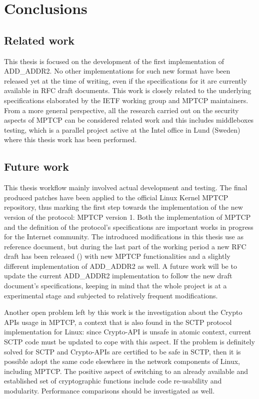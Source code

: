 \chapter{Conclusions}
\label{chap:conclusions}

\section{Related work}
This thesis is focused on the development of the first implementation of ADD\_ADDR2. No other implementations for such new format have been released yet at the time of writing, even if the specifications for it are currently available in RFC draft documents. This work is closely related to the underlying specifications elaborated by the IETF working group and MPTCP maintainers. From a more general perspective, all the research carried out on the security aspects of MPTCP can be considered related work and this includes middleboxes testing, which is a parallel project active at the Intel office in Lund (Sweden) where this thesis work has been performed. 

\section{Future work}
\label{future}
This thesis workflow mainly involved actual development and testing. The final produced patches have been applied to the official Linux Kernel MPTCP repository, thus marking the first step towards the implementation of the new version of the protocol: MPTCP version 1. 
Both the implementation of MPTCP and the definition of the protocol's specifications are important works in progress for the Internet community. The introduced modifications in this thesis use  as reference document, but during the last part of the working period a new RFC draft has been released () with new MPTCP functionalities and a slightly different implementation of ADD\_ADDR2 as well. A future work will be to update the current ADD\_ADDR2 implementation to follow the new draft document's specifications, keeping in mind that the whole project is at a experimental stage and subjected to relatively frequent modifications.

Another open problem left by this work is the investigation about the Crypto APIs usage in MPTCP, a context that is also found in the SCTP protocol implementation for Linux: since Crypto-API is unsafe in atomic context, current SCTP code must be updated to cope with this aspect. If the problem is definitely solved for SCTP and Crypto-APIs are certified to be safe in SCTP, then it is possible adopt the same code elsewhere in the network components of Linux, including MPTCP. The positive aspect of switching to an already available and established set of cryptographic functions include code re-usability and modularity. Performance comparisons should be investigated as well.

